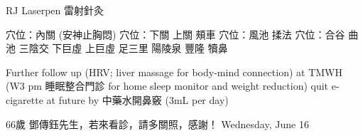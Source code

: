 \documentclass[aspectratio=169]{beamer}
\begin{document}
\begin{frame}
    \begin{outline}
\1 RJ Laserpen 雷射針灸

\2 穴位：內關 (安神止胸悶)
\2 穴位：下關 上關 頰車 
\2 穴位：風池 揉法 
\2 穴位：合谷 曲池 三陰交 下巨虛 上巨虛 足三里 陽陵泉 豐隆 犢鼻 

\1 Further follow up (HRV; liver massage for body-mind connection) at TMWH (W3 pm 睡眠整合門診 for home sleep 
\2 monitor and weight reduction)
\2 quit e-cigarette at future by 中藥水開鼻竅 (3mL per day)
    \end{outline}


\end{frame}

\begin{frame}
66歲 鄧傳鈺先生，若來看診，請多關照，感謝！
Wednesday, June 16
\end{frame}
\end{document}
